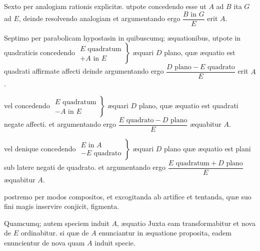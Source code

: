 \documentclass[11pt,a4paper]{article}
\begin{document}

Sexto per analogiam rationis explicitæ. utpote concedendo esse ut $A$ ad $B$ ita $G$ ad $E$, deinde resolvendo analogiam et argumentando ergo $\dfrac{B \text{ in } G}{E}$ erit $A$.

Septimo per parabolicam hypostasin in \ill{} quibuscumq; æquationibus, utpote in quadraticis concedendo $\left.\begin{array}{l} E \text{ quadratum} \\ + A \text{ in } E \end{array}\right\}$ æquari $D$ plano, quæ æquatio est quadrati affirmate affecti deinde argumentando ergo $\dfrac{D \text{ plano} - E \text{ quadrato}}{E}$ erit $A$.

vel concedendo $\left.\begin{array}{l} E \text{ quadratum} \\ - A \text{ in } E \end{array}\right\}$ æquari $D$ plano, quæ æquatio est quadrati negate affecti. et argumentando ergo $\dfrac{E \text{ quadrato} - D \text{ plano}}{E}$ æquabitur $A$.

vel denique concedendo $\left.\begin{array}{l} E \text{ in } A \\ - E \text{ quadrato} \end{array}\right\}$ æquari $D$ plano quæ æquatio est plani sub latere negati de quadrato. et argumentando ergo $\dfrac{E \text{ quadratum} + D \text{ plano}}{E}$ æquabitur $A$.

postremo per modos compositos, et excogitanda ab artifice et tentanda, quæ suo fini magis inservire conjicit, figmenta.

Quamcumq; autem speciem induit $A$, æquatio Juxta eam transformabitur et nova de $E$ ordinabitur. si quæ de $A$ enunciantur in æquatione proposita, eadem enuncientur de nova quam $A$ induit specie.
\end{document}
